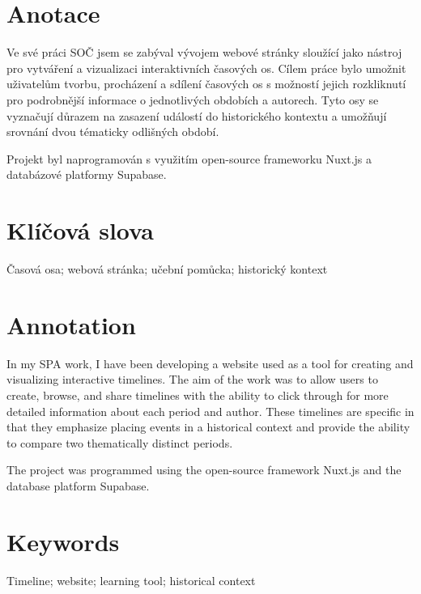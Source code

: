 \clearpageenabledfalse %
\newpage
\section*{Anotace}

Ve své práci SOČ jsem se zabýval vývojem webové stránky sloužící jako nástroj pro vytváření a vizualizaci interaktivních časových os. Cílem práce bylo umožnit uživatelům tvorbu, procházení a sdílení časových os s možností jejich rozkliknutí pro podrobnější informace o jednotlivých obdobích a autorech. Tyto osy se vyznačují důrazem na zasazení událostí do historického kontextu a umožňují srovnání dvou tématicky odlišných období.

Projekt byl naprogramován s využitím open-source frameworku Nuxt.js a databázové platformy Supabase.

\section*{Klíčová slova}
Časová osa; webová stránka; učební pomůcka; historický kontext

\vspace{40pt}

\section*{Annotation}
In my SPA work, I have been developing a website used as a tool for creating and visualizing interactive timelines. The aim of the work was to allow users to create, browse, and share timelines with the ability to click through for more detailed information about each period and author. These timelines are specific in that they emphasize placing events in a historical context and provide the ability to compare two thematically distinct periods.

The project was programmed using the open-source framework Nuxt.js and the database platform Supabase.

\section*{Keywords}
Timeline; website; learning tool; historical context


\clearpageenabledtrue